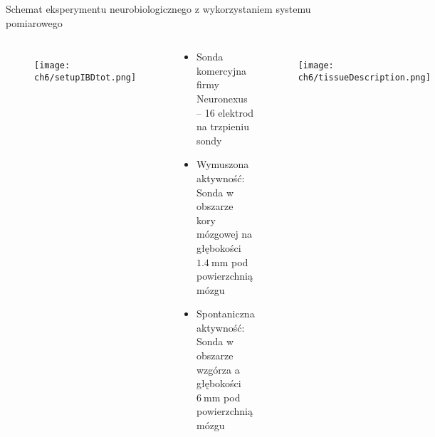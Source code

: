 \begin{frame}{Schemat eksperymentu neurobiologicznego z wykorzystaniem systemu pomiarowego}
    \begin{columns}

        \begin{figure}[H]
            \centering 
            \texttt{[image: ch6/setupIBDtot.png]}  
        \end{figure}

        \vspace{-1em}

        \begin{block}{}
            \begin{itemize}
                \item Sonda komercyjna firmy Neuronexus -- 16 elektrod na trzpieniu sondy
                \item Wymuszona aktywność: Sonda w obszarze kory mózgowej na głębokości $\SI{1.4}{\milli\metre}$ pod powierzchnią mózgu
                \item Spontaniczna aktywność: Sonda w obszarze wzgórza a głębokości $\SI{6}{\milli\metre}$ pod powierzchnią mózgu
            \end{itemize}
        \end{block}
        \vspace{-1em}

        \begin{figure}[H]
            \centering 
            \texttt{[image: ch6/tissueDescription.png]}  
        \end{figure}
    \end{columns}

\end{frame}

   
   

